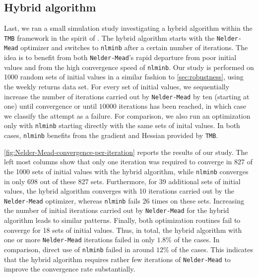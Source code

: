 \documentclass[]{interact}\usepackage[]{graphicx}\usepackage[dvipsnames]{xcolor}
\theoremstyle{plain}%
\theoremstyle{definition}
\theoremstyle{remark}
\begin{document}
\subsection{Hybrid algorithm}

Last, we ran a small simulation study investigating a hybrid algorithm within the {\tt{TMB}} framework in the spirit of \cite{bulla}. The hybrid algorithm starts with the \texttt{Nelder-Mead} optimizer and switches to \texttt{nlminb} after a certain number of iterations. The idea is to benefit from both \texttt{Nelder-Mead}'s rapid departure from poor initial values  and from the high convergence speed of \texttt{nlminb}. Our study is performed on 1000 random sets of initial values in a similar fashion to \autoref{sec:robustness}, using the weekly returns data set. For every set of initial values, we sequentially increase the number of iterations carried out by \texttt{Nelder-Mead} by ten (starting at one) until convergence or until $10 000$ iterations has been reached, in which case we classify the attempt as a failure. For comparison, we also run an optimization only with \texttt{nlminb} starting directly with the same sets of inital values. In both cases, \texttt{nlminb} benefits from the gradient and Hessian provided by {\tt{TMB}}. 

 \autoref{fig:Nelder-Mead-convergence-per-iteration} reports the results of our study. The left most columns show that only one iteration was required to converge in 827 of the 1000 sets of initial values with the hybrid algorithm, while \texttt{nlminb} converges in only 698 out of these 827 sets. Furthermore, for 39 additional sets of initial values, the hybrid algorithm converges with 10 iterations carried out by the \texttt{Nelder-Mead} optimizer, whereas \texttt{nlminb} fails 26 times on these sets. Increasing the number of initial iterations carried out by \texttt{Nelder-Mead} for the hybrid algorithm leads to similar patterns. Finally, both optimization routines fail to converge for 18 sets of initial values. Thus, in total, the hybrid algorithm with one or more \texttt{Nelder-Mead} iterations failed in only $1.8 \%$ of the cases. In comparison, direct use of \texttt{nlminb} failed in around $12 \%$ of the cases. This indicates that the hybrid algorithm requires rather few iterations of \texttt{Nelder-Mead} to improve the convergence rate substantially.
\end{document}
